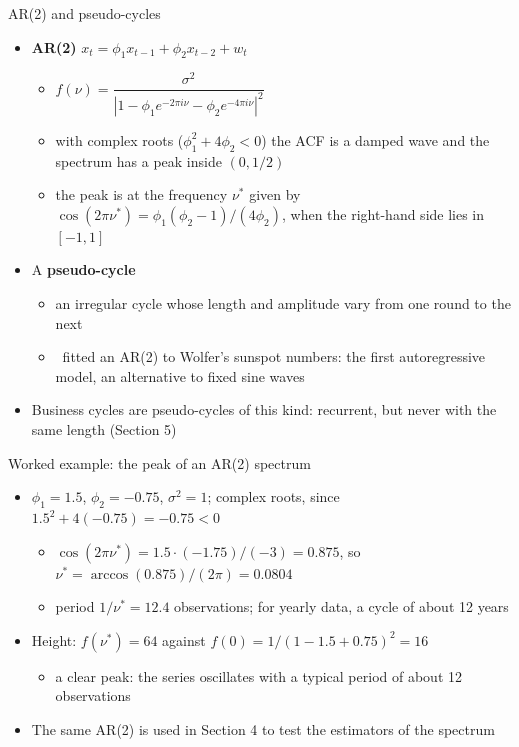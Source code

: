 \begin{frame}{AR(2) and pseudo-cycles}
\itemsize{\small}
\begin{itemize}
    \item \textbf{AR(2)} $x_t = \phi_1 x_{t-1} + \phi_2 x_{t-2} + w_t$
    \begin{itemize}
        \item $f(\nu) = \dfrac{\sigma^2}{|1 - \phi_1 e^{-2\pi i\nu} - \phi_2 e^{-4\pi i\nu}|^2}$
        \item with complex roots ($\phi_1^2 + 4\phi_2 < 0$) the ACF is a damped wave and the spectrum has a peak inside $(0, 1/2)$
        \item the peak is at the frequency $\nu^*$ given by $\cos(2\pi\nu^*) = \phi_1(\phi_2 - 1)/(4\phi_2)$, when the right-hand side lies in $[-1, 1]$
    \end{itemize}
    \item A \textbf{pseudo-cycle}
    \begin{itemize}
        \item an irregular cycle whose length and amplitude vary from one round to the next
        \item {}\ fitted an AR(2) to Wolfer's sunspot numbers: the first autoregressive model, an alternative to fixed sine waves
    \end{itemize}
    \item Business cycles are pseudo-cycles of this kind: recurrent, but never with the same length (Section 5)
\end{itemize}
\end{frame}

\begin{frame}{Worked example: the peak of an AR(2) spectrum}
\itemsize{\small}
\begin{itemize}
    \item $\phi_1 = 1.5$, $\phi_2 = -0.75$, $\sigma^2 = 1$; complex roots, since $1.5^2 + 4(-0.75) = -0.75 < 0$
    \begin{itemize}
        \item $\cos(2\pi\nu^*) = 1.5 \cdot (-1.75)/(-3) = 0.875$, so $\nu^* = \arccos(0.875)/(2\pi) = 0.0804$
        \item period $1/\nu^* = 12.4$ observations; for yearly data, a cycle of about 12 years
    \end{itemize}
    \item Height: $f(\nu^*) = 64$ against $f(0) = 1/(1 - 1.5 + 0.75)^2 = 16$
    \begin{itemize}
        \item a clear peak: the series oscillates with a typical period of about 12 observations
    \end{itemize}
    \item The same AR(2) is used in Section 4 to test the estimators of the spectrum
\end{itemize}
\end{frame}

